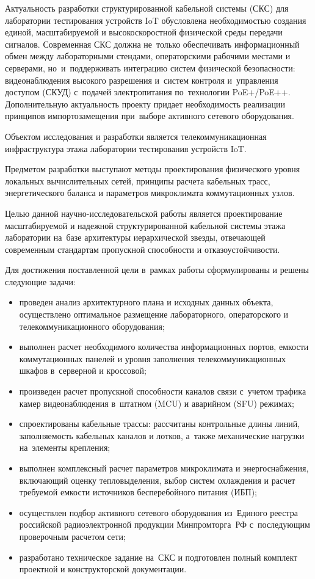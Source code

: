 \documentclass[a4paper,oneside,14pt]{extreport}
\begin{document}
Актуальность разработки структурированной кабельной системы (СКС) для лаборатории тестирования устройств IoT обусловлена необходимостью создания единой, масштабируемой и высокоскоростной физической среды передачи сигналов. Современная СКС должна не~только обеспечивать информационный обмен между лабораторными стендами, операторскими рабочими местами и серверами, но~и~поддерживать интеграцию систем физической безопасности: видеонаблюдения высокого разрешения и~систем контроля и~управления доступом (СКУД) с~подачей электропитания по~технологии PoE+/PoE++. Дополнительную актуальность проекту придает необходимость реализации принципов импортозамещения при~выборе активного сетевого оборудования.

Объектом исследования и разработки является телекоммуникационная инфраструктура этажа лаборатории тестирования устройств IoT.

Предметом разработки выступают методы проектирования физического уровня локальных вычислительных сетей, принципы расчета кабельных трасс, энергетического баланса и параметров микроклимата коммутационных узлов.

Целью данной научно-исследовательской работы является проектирование масштабируемой и надежной структурированной кабельной системы этажа лаборатории на~базе архитектуры иерархической звезды, отвечающей современным стандартам пропускной способности и отказоустойчивости.

Для достижения поставленной цели в~рамках работы сформулированы и решены следующие задачи:
\begin{itemize}
    \item проведен анализ архитектурного плана и исходных данных объекта, осуществлено оптимальное размещение лабораторного, операторского и телекоммуникационного оборудования;
    \item выполнен расчет необходимого количества информационных портов, емкости коммутационных панелей и уровня заполнения телекоммуникационных шкафов в~серверной и кроссовой;
    \item произведен расчет пропускной способности каналов связи с~учетом трафика камер видеонаблюдения в~штатном (MCU) и аварийном (SFU) режимах;
    \item спроектированы кабельные трассы: рассчитаны контрольные длины линий, заполняемость кабельных каналов и лотков, а~также механические нагрузки на~элементы крепления;
    \item выполнен комплексный расчет параметров микроклимата и энергоснабжения, включающий оценку тепловыделения, выбор систем охлаждения и расчет требуемой емкости источников бесперебойного питания (ИБП);
    \item осуществлен подбор активного сетевого оборудования из~Единого реестра российской радиоэлектронной продукции Минпромторга~РФ с~последующим проверочным расчетом сети;
    \item разработано техническое задание на~СКС и подготовлен полный комплект проектной и конструкторской документации.
\end{itemize}
\end{document}
